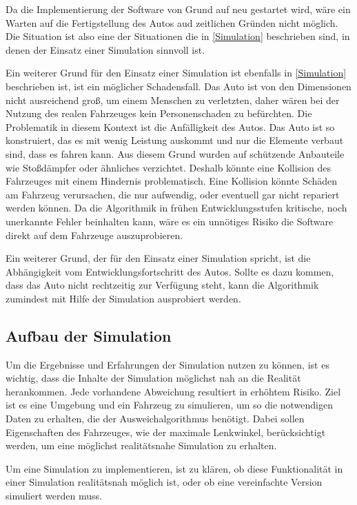 Da die Implementierung der Software von Grund auf neu gestartet wird, wäre ein Warten auf die Fertigstellung des Autos aud zeitlichen Gründen nicht möglich.
Die Situation ist also eine der Situationen die in \ref{Simulation} beschrieben sind, in denen der Einsatz einer Simulation sinnvoll ist.

Ein weiterer Grund für den Einsatz einer Simulation ist ebenfalls in \ref{Simulation} beschrieben ist, 
ist ein möglicher Schadensfall. Das Auto ist von den Dimensionen nicht ausreichend groß, 
um einem Menschen zu verletzten, daher wären bei der Nutzung des realen Fahrzeuges kein Personenschaden zu befürchten.
Die Problematik in diesem Kontext ist die Anfälligkeit des Autos. 
Das Auto ist so konstruiert, das es mit wenig Leistung auskommt und nur die Elemente verbaut sind, dass es fahren kann. 
Aus diesem Grund wurden auf schützende Anbauteile wie Stoßdämpfer oder ähnliches verzichtet.
Deshalb könnte eine Kollision des Fahrzeuges mit einem Hindernis problematisch. 
Eine Kollision könnte Schäden am Fahrzeug verursachen, die nur aufwendig, oder eventuell gar nicht repariert werden können.
Da die Algorithmik in frühen Entwicklungsstufen kritische, noch unerkannte Fehler beinhalten kann,
wäre es ein unnötiges Risiko die Software direkt auf dem Fahrzeuge auszuprobieren.

Ein weiterer Grund, der für den Einsatz einer Simulation spricht, ist die Abhängigkeit vom Entwicklungsfortschritt des Autos. 
Sollte es dazu kommen, dass das Auto nicht rechtzeitig zur Verfügung steht, 
kann die Algorithmik zumindest mit Hilfe der Simulation ausprobiert werden.

\subsection{Aufbau der Simulation}
Um die Ergebnisse und Erfahrungen der Simulation nutzen zu können, ist es wichtig, dass die Inhalte der Simulation möglichst nah an die Realität herankommen.
Jede vorhandene Abweichung resultiert in erhöhtem Risiko. 
Ziel ist es eine Umgebung und ein Fahrzeug zu simulieren, um so die notwendigen Daten zu erhalten, die der Ausweichalgorithmus benötigt.
Dabei sollen Eigenschaften des Fahrzeuges, wie der maximale Lenkwinkel, berücksichtigt werden, um eine möglichst realitätsnahe Simulation zu erhalten.   

Um eine Simulation zu implementieren, ist zu klären, ob diese Funktionalität in einer Simulation realitätsnah möglich ist, oder ob eine vereinfachte Version simuliert werden muss.

